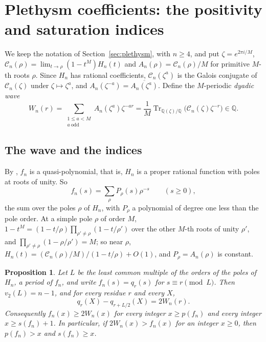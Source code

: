 \documentclass[11pt,a4paper]{article}
\newtheorem{proposition}[theorem]{Proposition}
\theoremstyle{definition}
\newcommand{\Q}{\mathbb{Q}}
\newcommand{\Tr}{\operatorname{Tr}}
\begin{document}
\section{Plethysm coefficients: the positivity and saturation indices}\label{sec:indices}

We keep the notation of Section~\ref{sec:plethysm}, with $n\ge4$, and put
$\zeta=e^{2\pi i/M}$, $\mathcal C_n(\rho)=\lim_{t\to\rho}(1-t^M)H_n(t)$ and
$A_n(\rho)=\mathcal C_n(\rho)/M$ for primitive $M$-th roots $\rho$. Since
$H_n$ has rational coefficients, $\mathcal C_n(\zeta^a)$ is the Galois
conjugate of $\mathcal C_n(\zeta)$ under $\zeta\mapsto\zeta^a$, and
$A_n(\zeta^{-a})=\overline{A_n(\zeta^a)}$. Define the $M$-periodic
\emph{dyadic wave}
\begin{equation}\label{eq:wave}
 W_n(r)=\sum_{\substack{1\le a<M\\a\ \mathrm{odd}}}A_n(\zeta^a)\zeta^{-ar}
 =\frac1M\Tr_{\Q(\zeta)/\Q}\bigl(\mathcal C_n(\zeta)\zeta^{-r}\bigr)\in\Q .
\end{equation}

\subsection{The wave and the indices}

By \cite[Theorem 1.6.1(b), p.~21]{GCT6}, $f_n$ is a quasi-polynomial, that is,
$H_n$ is a proper rational function with poles at roots of unity. So
\begin{equation}\label{eq:fourier}
 f_n(s)=\sum_\rho P_\rho(s)\rho^{-s}\qquad(s\ge0),
\end{equation}
the sum over the poles $\rho$ of $H_n$, with $P_\rho$ a polynomial of degree
one less than the pole order. At a simple pole $\rho$ of order $M$,
$1-t^M=(1-t/\rho)\prod_{\rho'\ne\rho}(1-t/\rho')$ over the other $M$-th roots
of unity $\rho'$, and $\prod_{\rho'\ne\rho}(1-\rho/\rho')=M$; so near $\rho$,
$H_n(t)=(\mathcal C_n(\rho)/M)/(1-t/\rho)+O(1)$, and $P_\rho=A_n(\rho)$ is
constant.

\begin{proposition}\label{prop:wave}
Let $L$ be the least common multiple of the orders of the poles of $H_n$, a
period of $f_n$, and write $f_n(s)=q_r(s)$ for $s\equiv r\pmod L$. Then
$v_2(L)=n-1$, and for every residue $r$ and every $X$,
\begin{equation}\label{eq:waveidentity}
 q_r(X)-q_{r+L/2}(X)=2W_n(r).
\end{equation}
Consequently $f_n(x)\ge2W_n(x)$ for every integer $x\ge p(f_n)$ and every
integer $x\ge s(f_n)+1$. In particular, if $2W_n(x)>f_n(x)$ for an integer
$x\ge0$, then $p(f_n)>x$ and $s(f_n)\ge x$.
\end{proposition}
\end{document}
